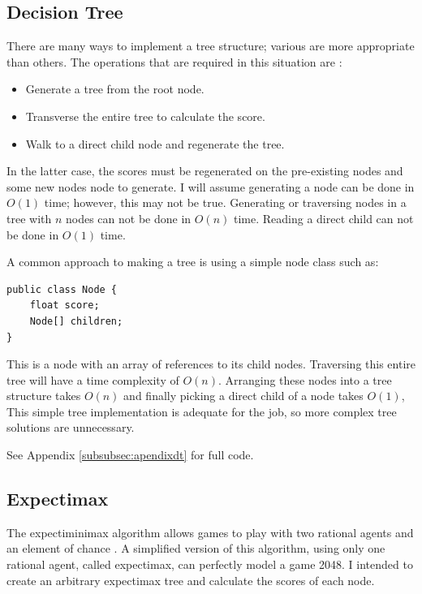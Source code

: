 \documentclass{article}
\begin{document}
\subsection{Decision Tree}
\label{subsec:dt}
There are many ways to implement a tree structure; various are more appropriate than others. The operations that are required in this situation are \cite{russell2010artificial}:
\begin{itemize}
    \item Generate a tree from the root node.
    \item Transverse the entire tree to calculate the score.
    \item Walk to a direct child node and regenerate the tree.
\end{itemize}
In the latter case, the scores  must be regenerated on the pre-existing nodes and some new nodes node to generate.
I will assume generating a node can be done in $O(1)$ time; however, this may not be true. Generating or traversing nodes in a tree with $n$ nodes can not be done in $O(n)$ time. Reading a direct child can not be done in $O(1)$ time.

A common approach to making a tree is using a simple node class such as:
\begin{verbatim}
public class Node {
    float score;
    Node[] children;
}
\end{verbatim}
This is a node with an array of references to its child nodes. Traversing this entire tree will have a time complexity of 
$O(n)$. Arranging these nodes into a tree structure takes $O(n)$ and finally picking a direct child of a node takes $O(1)$,
This simple tree implementation is adequate for the job, so more complex tree solutions are unnecessary.

See Appendix \ref{subsubsec:apendixdt} for full code.
\subsection{Expectimax}
The expectiminimax algorithm allows games to play with two rational agents and an element of chance \cite[p.~200]{russell2010artificial}. A simplified version of this algorithm, using only one rational agent, called expectimax, can perfectly model a game 2048. I intended to create an arbitrary expectimax tree and calculate the scores of each node.
\end{document}

